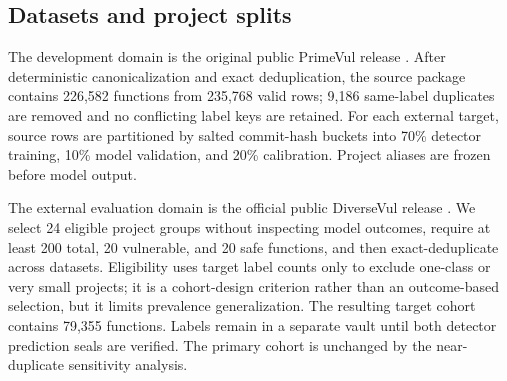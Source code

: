 \documentclass[preprint,12pt]{elsarticle}
\begin{document}
\subsection{Datasets and project splits}

The development domain is the original public PrimeVul release \cite{ding2025primevul}. After deterministic canonicalization and exact deduplication, the source package contains 226,582 functions from 235,768 valid rows; 9,186 same-label duplicates are removed and no conflicting label keys are retained. For each external target, source rows are partitioned by salted commit-hash buckets into 70\% detector training, 10\% model validation, and 20\% calibration. Project aliases are frozen before model output.

The external evaluation domain is the official public DiverseVul release \cite{chen2023diversevul}. We select 24 eligible project groups without inspecting model outcomes, require at least 200 total, 20 vulnerable, and 20 safe functions, and then exact-deduplicate across datasets. Eligibility uses target label counts only to exclude one-class or very small projects; it is a cohort-design criterion rather than an outcome-based selection, but it limits prevalence generalization. The resulting target cohort contains 79,355 functions. Labels remain in a separate vault until both detector prediction seals are verified. The primary cohort is unchanged by the near-duplicate sensitivity analysis.
\end{document}
